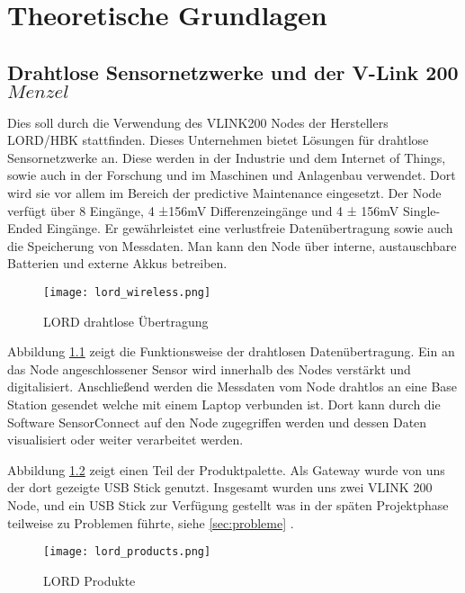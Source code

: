 \chapter{Theoretische Grundlagen}


\section{Drahtlose Sensornetzwerke und der V-Link 200 \(Menzel\)}

Dies soll durch die Verwendung des VLINK200 Nodes der Herstellers LORD/HBK stattfinden.
Dieses Unternehmen bietet Lösungen für drahtlose Sensornetzwerke an. Diese werden in der Industrie und dem Internet of Things, sowie auch in der Forschung und im Maschinen und Anlagenbau verwendet.
Dort wird sie vor allem im Bereich der predictive Maintenance eingesetzt.
Der Node verfügt über 8 Eingänge, 4 ±156mV Differenzeingänge und 4 ± 156mV Single-Ended Eingänge.
Er gewährleistet eine verlustfreie Datenübertragung sowie auch die Speicherung von Messdaten.
Man kann den Node über interne, austauschbare Batterien und externe Akkus betreiben.

\begin{figure}[h]
    \begin{center}
        \texttt{[image: lord\_wireless.png]}
        \caption[LORD drahtlose Übertragung (Abbildungsverzeichnis)]{LORD drahtlose Übertragung
        \cite{VLInkManual}
        }
        \label{fig:lordwireless}
    \end{center}
\end{figure}

Abbildung \ref{fig:lordwireless} zeigt die Funktionsweise der drahtlosen Datenübertragung.
Ein an das Node angeschlossener Sensor wird innerhalb des Nodes verstärkt und digitalisiert.
Anschließend werden die Messdaten vom Node drahtlos an eine Base Station gesendet welche mit einem Laptop verbunden ist.
Dort kann durch die Software SensorConnect auf den Node zugegriffen werden und dessen Daten visualisiert oder weiter verarbeitet werden.


Abbildung \ref{fig:lordproducts} zeigt einen Teil der Produktpalette.
Als Gateway wurde von uns der dort gezeigte USB Stick genutzt.
Insgesamt wurden uns zwei VLINK 200 Node, und ein USB Stick zur Verfügung gestellt was in der späten Projektphase teilweise zu Problemen führte,
siehe \ref{sec:probleme} .

\begin{figure}[h]
    \begin{center}
        \texttt{[image: lord\_products.png]}
        \caption[LORD Produkte (Abbildungsverzeichnis)]{LORD Produkte
        \cite{VLInkManual}
        }
        \label{fig:lordproducts}
    \end{center}
\end{figure}


